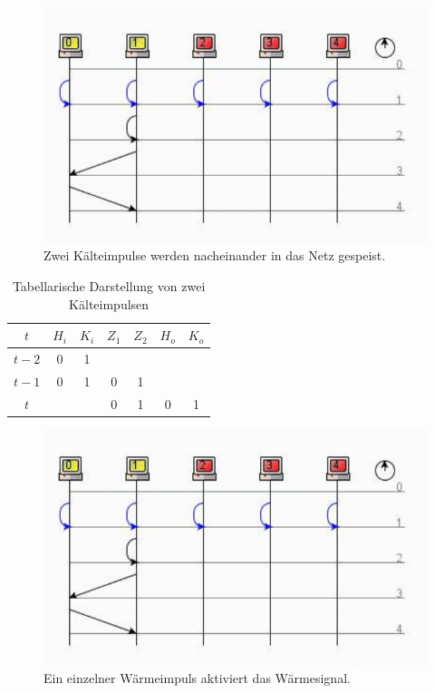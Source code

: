 \begin{figure}[h]
    \centering
    \includegraphics{images/p1ReadSeq.pdf}
    \caption{Zwei Kälteimpulse werden nacheinander in das Netz gespeist.}
    \label{fig-coldimp}
\end{figure}


\begin{table} %
    \centering
    \begin{tabular}{c | c | c | c | c | c | c}
        $t$   & $H_i$ & $K_i$ & $Z_1$ & $Z_2$ & $H_o$ & $K_o$ \\
        \hline
        $t-2$ & 0     & 1     &          &          &          &          \\
        $t-1$ & 0     & 1     & 0        & 1        &          &          \\
        $t$   &       &       & 0         & 1         & 0        & 1        \\
    \end{tabular}
    \caption{Tabellarische Darstellung von zwei Kälteimpulsen}
    \label{tab:coldimp}
\end{table}


\begin{figure}[h]
    \centering
    \includegraphics{images/p1ReadSeq.pdf}
    \caption{Ein einzelner Wärmeimpuls aktiviert das Wärmesignal.}
    \label{fig-heatimp}
\end{figure}



